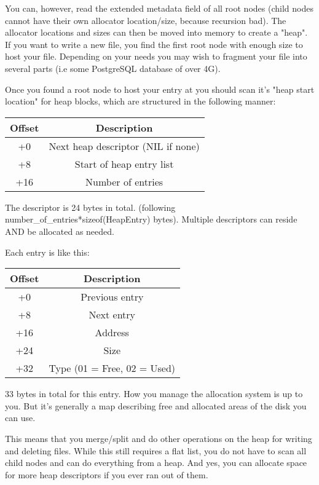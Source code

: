 \documentclass[12pt]{article}
\begin{document}
You can, however, read the extended metadata field of all root nodes (child nodes cannot have their own allocator location/size, because recursion bad). The allocator locations and sizes can then be moved into memory to create a "heap". If you want to write a new file, you find the first root node with enough size to host your file. Depending on your needs you may wish to fragment your file into several parts (i.e some PostgreSQL database of over 4G).

Once you found a root node to host your entry at you should scan it's "heap start location" for heap blocks, which are structured in the following manner:
\begin{center}
\begin{tabular}{ |c|c| }
\hline
Offset & Description \\
\hline
+0 & Next heap descriptor (NIL if none) \\
+8 & Start of heap entry list \\
+16 & Number of entries \\
\hline
\end{tabular}
\end{center}

The descriptor is 24 bytes in total. (following number\_of\_entries*sizeof(HeapEntry) bytes). Multiple descriptors can reside AND be allocated as needed.

Each entry is like this:
\begin{center}
\begin{tabular}{ |c|c| }
\hline
Offset & Description \\
\hline
+0 & Previous entry \\
+8 & Next entry \\
+16 & Address \\
+24 & Size \\
+32 & Type (01 = Free, 02 = Used) \\
\hline
\end{tabular}
\end{center}

33 bytes in total for this entry. How you manage the allocation system is up to you. But it's generally a map describing free and allocated areas of the disk you can use.

This means that you merge/split and do other operations on the heap for writing and deleting files. While this still requires a flat list, you do not have to scan all child nodes and can do everything from a heap. And yes, you can allocate space for more heap descriptors if you ever ran out of them.
\end{document}
